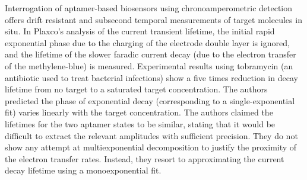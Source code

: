Interrogation of aptamer-based biosensors using chronoamperometric detection offers drift resistant and subsecond temporal measurements of target molecules in situ. In Plaxco's analysis of the current transient lifetime, the initial rapid exponential phase due to the charging of the electrode double layer is ignored, and the lifetime of the slower faradic current decay (due to the electron transfer of the methylene-blue) is measured. Experimental results using tobramycin (an antibiotic used to treat bacterial infections) show a five times reduction in decay lifetime from no target to a saturated target concentration. The authors predicted the phase of exponential decay (corresponding to a single-exponential fit) varies linearly with the target concentration. The authors claimed the lifetimes for the two aptamer states to be similar, stating that it would be difficult to extract the relevant amplitudes with sufficient precision. They do not show any attempt at multiexponential decomposition to justify the proximity of the electron transfer rates. Instead, they resort to approximating the current decay lifetime using a monoexponential fit.\\\\
